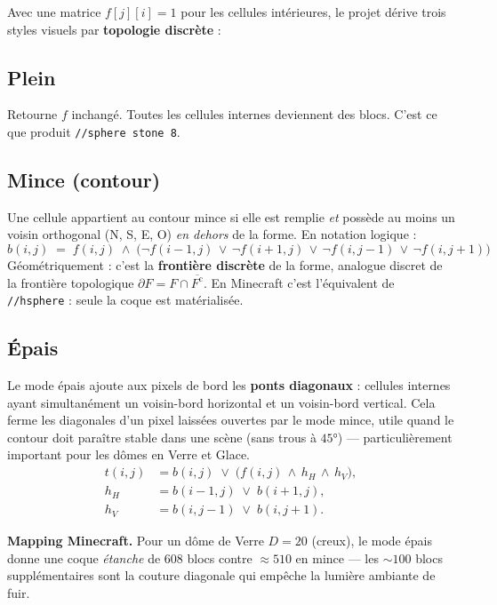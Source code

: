 \documentclass[12pt,a4paper]{scrartcl}
\newcommand{\acc}[1]{\textcolor{accent}{\textbf{#1}}}
\newcommand{\cmd}[1]{\textcolor{earth}{\texttt{\small #1}}}
\begin{document}
Avec une matrice $f[j][i] = 1$ pour les cellules intérieures, le projet dérive trois styles visuels par \acc{topologie discrète} :

\subsection{Plein}
Retourne $f$ inchangé. Toutes les cellules internes deviennent des blocs. C'est ce que produit \cmd{//sphere stone 8}.

\subsection{Mince (contour)}
Une cellule appartient au contour mince si elle est remplie \emph{et} possède au moins un voisin orthogonal (N, S, E, O) \emph{en dehors} de la forme. En notation logique :
\[
b(i,j) \;=\; f(i,j) \;\wedge\;
\bigl(\neg f(i{-}1,j)\,\vee\,\neg f(i{+}1,j)\,\vee\,\neg f(i,j{-}1)\,\vee\,\neg f(i,j{+}1)\bigr)
\]
Géométriquement : c'est la \acc{frontière discrète} de la forme, analogue discret de la frontière topologique $\partial F = F \cap \overline{F^{\mathrm{c}}}$. En Minecraft c'est l'équivalent de \cmd{//hsphere} : seule la coque est matérialisée.

\subsection{Épais}
Le mode épais ajoute aux pixels de bord les \acc{ponts diagonaux} : cellules internes ayant simultanément un voisin-bord horizontal et un voisin-bord vertical. Cela ferme les diagonales d'un pixel laissées ouvertes par le mode mince, utile quand le contour doit paraître stable dans une scène (sans trous à $45°$) --- particulièrement important pour les dômes en Verre et Glace.
\begin{align*}
t(i,j) &= b(i,j) \;\vee\; \bigl(f(i,j) \,\wedge\, h_H \,\wedge\, h_V\bigr), \\
h_H &= b(i{-}1,j) \;\vee\; b(i{+}1,j), \\
h_V &= b(i,j{-}1) \;\vee\; b(i,j{+}1).
\end{align*}

\begin{minec}
\textbf{Mapping Minecraft.} Pour un dôme de Verre $D=20$ (creux), le mode épais donne une coque \emph{étanche} de $608$ blocs contre $\approx 510$ en mince --- les $\sim 100$ blocs supplémentaires sont la couture diagonale qui empêche la lumière ambiante de fuir.
\end{minec}
\end{document}
